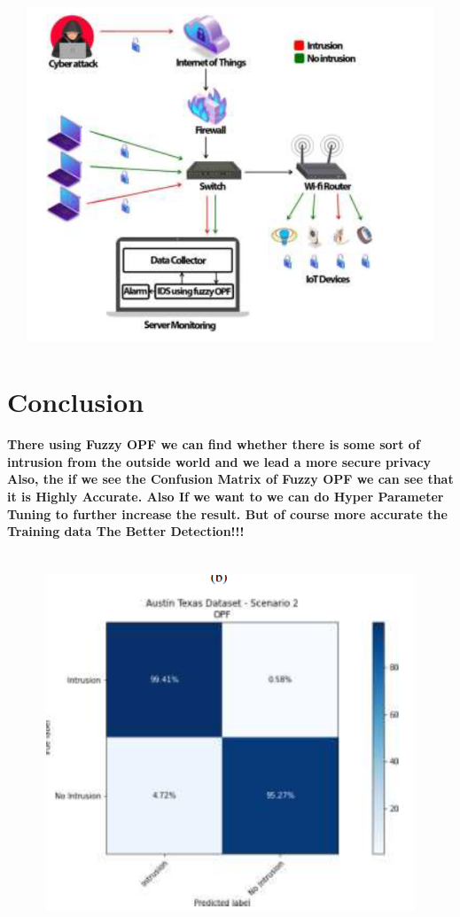 \documentclass[a4paper,15pt]{article}
\begin{document}
\section*{
\includegraphics[width=15cm, height=10cm]{flowchart}
}
\paragraph{}
\section*{Conclusion}
\paragraph{
There using Fuzzy OPF we can find whether there is some sort of intrusion from the outside world and we lead a more secure privacy
Also, the if we see the Confusion Matrix of Fuzzy OPF we can see that it is Highly Accurate. Also If we want to we can do Hyper Parameter Tuning to further increase the result. But of course more accurate the Training data The Better Detection!!!
}
\section*{
\includegraphics[width=15cm, height=10cm]{Confusion}
}
\end{document}
